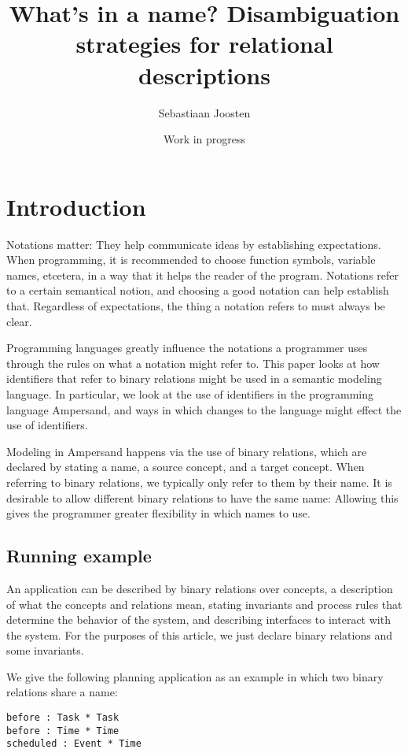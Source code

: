 \documentclass[12pt]{article}
\begin{document}
\title{What's in a name? Disambiguation strategies for relational descriptions}
\author{Sebastiaan Joosten}
\date{Work in progress}
\maketitle

\section{Introduction}
Notations matter: They help communicate ideas by establishing expectations.
When programming, it is recommended to choose function symbols, variable names, etcetera, in a way that it helps the reader of the program.
Notations refer to a certain semantical notion, and choosing a good notation can help establish that.
Regardless of expectations, the thing a notation refers to must always be clear.

Programming languages greatly influence the notations a programmer uses through the rules on what a notation might refer to.
This paper looks at how identifiers that refer to binary relations might be used in a semantic modeling language.
In particular, we look at the use of identifiers in the programming language Ampersand, and ways in which changes to the language might effect the use of identifiers.

Modeling in Ampersand happens via the use of binary relations, which are declared by stating a name, a source concept, and a target concept.
When referring to binary relations, we typically only refer to them by their name.
It is desirable to allow different binary relations to have the same name:
Allowing this gives the programmer greater flexibility in which names to use.

\subsection*{Running example}
An application can be described by binary relations over concepts, a description of what the concepts and relations mean, stating invariants and process rules that determine the behavior of the system, and describing interfaces to interact with the system.
For the purposes of this article, we just declare binary relations and some invariants.

We give the following planning application as an example in which two binary relations share a name:
\begin{verbatim}
before : Task * Task
before : Time * Time
scheduled : Event * Time
\end{verbatim}
\end{document}
